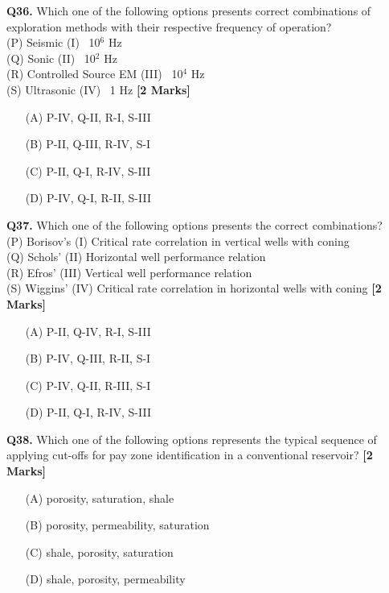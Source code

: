 \documentclass[11pt]{article}
\newcommand{\questionb}[2]{
    \noindent\textbf{Q#2.} #1 \hfill \textbf{[2 Marks]}
}
\begin{document}
\questionb{Which one of the following options presents correct combinations of exploration methods with their respective frequency of operation? \\
(P) Seismic \hspace{2cm} (I) ~10\(^6\) Hz \\
(Q) Sonic \hspace{2.2cm} (II) ~10\(^2\) Hz \\
(R) Controlled Source EM \hspace{0.5cm} (III) ~10\(^4\) Hz \\
(S) Ultrasonic \hspace{1.5cm} (IV) ~1 Hz}{36}
\begin{enumerate}
    \item[(A)] P-IV, Q-II, R-I, S-III  
    \item[(B)] P-II, Q-III, R-IV, S-I  
    \item[(C)] P-II, Q-I, R-IV, S-III  
    \item[(D)] P-IV, Q-I, R-II, S-III  
\end{enumerate}
\vspace{0.5cm}

\questionb{Which one of the following options presents the correct combinations? \\
(P) Borisov’s \hspace{2cm} (I) Critical rate correlation in vertical wells with coning \\
(Q) Schols’ \hspace{2.3cm} (II) Horizontal well performance relation \\
(R) Efros’ \hspace{2.5cm} (III) Vertical well performance relation \\
(S) Wiggins’ \hspace{2cm} (IV) Critical rate correlation in horizontal wells with coning}{37}
\begin{enumerate}
    \item[(A)] P-II, Q-IV, R-I, S-III  
    \item[(B)] P-IV, Q-III, R-II, S-I  
    \item[(C)] P-IV, Q-II, R-III, S-I  
    \item[(D)] P-II, Q-I, R-IV, S-III  
\end{enumerate}
\vspace{0.5cm}

\questionb{Which one of the following options represents the typical sequence of applying cut-offs for pay zone identification in a conventional reservoir?}{38}
\begin{enumerate}
    \item[(A)] porosity, saturation, shale  
    \item[(B)] porosity, permeability, saturation  
    \item[(C)] shale, porosity, saturation  
    \item[(D)] shale, porosity, permeability  
\end{enumerate}
\vspace{0.5cm}
\end{document}
